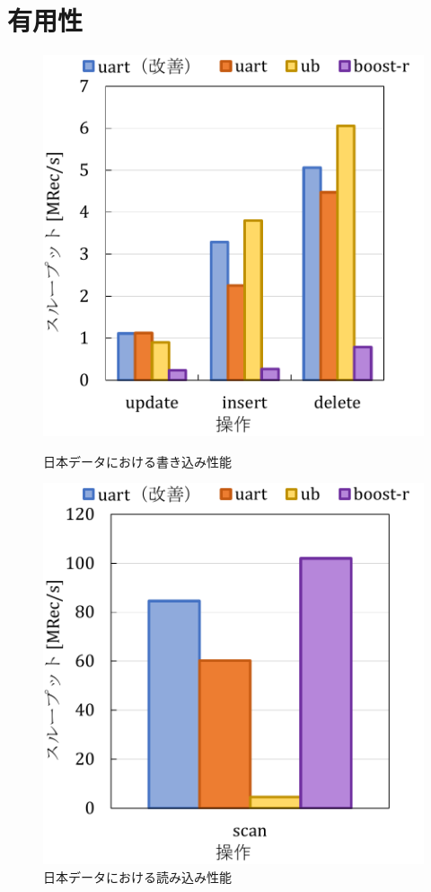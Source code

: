 \section{有用性}

\begin{figure}[tb]
  \begin{minipage}[c]{0.495\textwidth}
    \centering
    \includegraphics[scale=0.5]{./figures/graph-japan-write.pdf}
    \caption{日本データにおける書き込み性能}
    \label{fig:japan}
  \end{minipage}
  \begin{minipage}[c]{0.495\textwidth}
    \centering
    \includegraphics[scale=0.5]{./figures/graph-japan-read.pdf}
    \caption{日本データにおける読み込み性能}
    \label{fig:japan}
  \end{minipage}
\end{figure}
